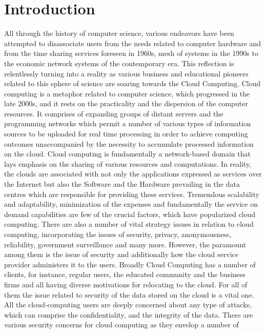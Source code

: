\section{Introduction}

All through the history of computer science, various endeavors have been attempted to
disassociate users from the needs related to computer hardware and from the time sharing
services foreseen in 1960s, mesh of systems in the 1990s to the economic network systems of
the contemporary era. This reflection is relentlessly turning into a reality as various business
and educational pioneers related to this sphere of science are soaring towards the Cloud
Computing.\cite{jensen}
Cloud computing is a metaphor related to computer science, which progressed in the late
2000s, and it rests on the practicality and the dispersion of the computer resources. It
comprises of expanding groups of distant servers and the programming networks which permit
a number of various types of information sources to be uploaded for real time processing in
order to achieve computing outcomes unaccompanied by the necessity to accumulate
processed information on the cloud. Cloud computing is fundamentally a network-based
domain that lays emphasis on the sharing of various resources and computations. In reality, the
clouds are associated with not only the applications expressed as services over the Internet but
also the Software and the Hardware prevailing in the data centres which are responsible for
providing these services.\cite{sabahi} Tremendous scalability and adaptability, minimization of the
expenses and fundamentally the service on demand capabilities are few of the crucial factors,
which have popularized cloud computing.
There are also a number of vital strategy issues in relation to cloud computing, incorporating
the issues of security, privacy, anonymousness, reliability, government surveillance and many
more. However, the paramount among them is the issue of security and additionally how the
cloud service provider administers it to the users. Broadly Cloud Computing has a number of
clients, for instance, regular users, the educated community and the business firms and all
having diverse motivations for relocating to the cloud.  For all of them the issue related to
security of the data stored on the cloud is a vital one. All the cloud-computing users are deeply
concerned about any type of attacks, which can comprise the confidentiality, and the integrity
of the data.\cite{kandias}
There are various security concerns for cloud computing as they envelop a number of
